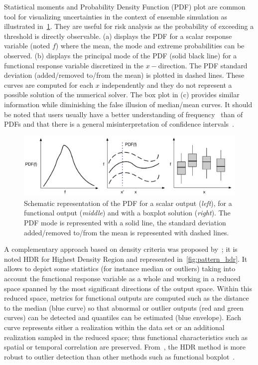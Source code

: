 Statistical moments and Probability Density Function (PDF) plot are common tool for visualizing uncertainties in the context of ensemble simulation as illustrated in~\cref{fig:pattern_pdf}. They are useful for risk analysis as the probability of exceeding a threshold is directly observable. (a) displays the PDF for a scalar response variable (noted $f$) where the mean, the mode and extreme probabilities can be observed. (b) displays the principal mode of the PDF (solid black line) for a functional response variable discretized in the $x-$direction. The PDF standard deviation (added/removed to/from the mean) is plotted in dashed lines. These curves are computed for each $x$ independently and they do not represent a possible solution of the numerical solver. The box plot in (c) provides similar information while diminishing the false illusion of median/mean curves. It should be noted that users usually have a better understanding of frequency~\citep{Gigerenzer1995} than of PDFs and that there is a  general misinterpretation of confidence intervals~\citep{Belia2005}.
\begin{figure}[!h]
\centering
\includegraphics[width=\linewidth,keepaspectratio]{fig/literature/patterns_pdf.pdf}
\caption{Schematic representation of the PDF for a scalar output (\emph{left}), for a functional output (\emph{middle}) and with a boxplot solution (\emph{right}). The PDF mode is represented with a solid line, the standard deviation added/removed to/from the mean is represented with dashed lines.}
\label{fig:pattern_pdf}
\end{figure}

A complementary approach based on density criteria was proposed by~\citep{Hyndman2009,Sun2011}; it is noted HDR for Highest Density Region and represented in~\cref{fig:pattern_hdr}. It allows to depict some statistics (for instance median or outliers) taking into account the functional response variable as a whole and working in a reduced space spanned by the most significant directions of the output space. Within this reduced space, metrics for functional outputs are computed such as the distance to the median (blue curve) so that abnormal or outlier outputs (red and green curves) can be detected and quantiles can be estimated (blue envelope). Each curve represents either a realization within the data set or an additional realization sampled in the reduced space; thus functional characteristics such as spatial or temporal correlation are preserved.  From~\citep{Popelin2013,Ribes2015}, the HDR method is more robust to outlier detection than other methods such as functional boxplot~\citep{Sun2011,Whitaker2013}.

